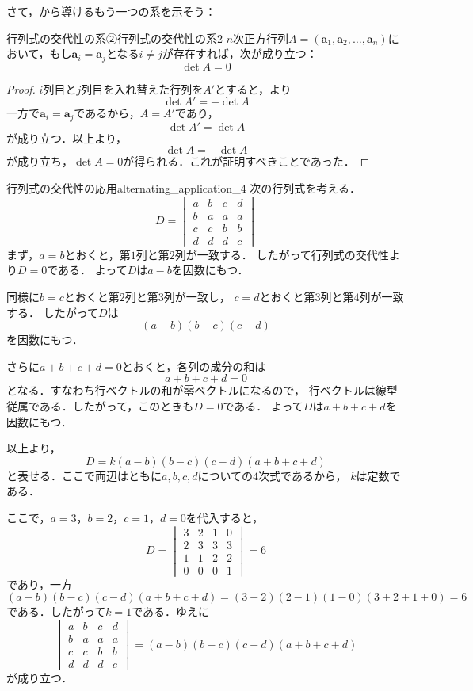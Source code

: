  さて，から導けるもう一つの系を示そう：
\begin{cor}{行列式の交代性の系②}{行列式の交代性の系2}
  $n$次正方行列$A = (\bm{a}_1, \bm{a}_2, \dots, \bm{a}_n)$において，もし$\bm{a}_i = \bm{a}_j$となる$i \ne j$が存在すれば，次が成り立つ：
  \[
  \det A = 0
  \]
\end{cor}

\begin{leftbar}
\begin{proof}
  $i$列目と$j$列目を入れ替えた行列を$A'$とすると，より
  \[
  \det A' = - \det A
  \]
  一方で$\bm{a}_i = \bm{a}_j$であるから，$A = A'$であり，
  \[
  \det A' = \det A
  \]
  が成り立つ．以上より，
  \[
  \det A = - \det A
  \]
  が成り立ち，$\det A = 0$が得られる．これが証明すべきことであった．
\end{proof}
\end{leftbar}

\begin{example}{行列式の交代性の応用}{alternating_application_4}
  次の行列式を考える．
  \[
  D=
  \begin{vmatrix} 
    a & b & c & d \\
    b & a & a & a \\
    c & c & b & b \\
    d & d & d & c
  \end{vmatrix}
  \]
  まず，$a=b$とおくと，第$1$列と第$2$列が一致する．
  したがって行列式の交代性より$D=0$である．
  よって$D$は$a-b$を因数にもつ．

  同様に$b=c$とおくと第$2$列と第$3$列が一致し，
  $c=d$とおくと第$3$列と第$4$列が一致する．
  したがって$D$は
  \[
    (a-b)(b-c)(c-d)
  \]
  を因数にもつ．

  さらに$a+b+c+d=0$とおくと，各列の成分の和は
  \[
    a+b+c+d=0
  \]
  となる．すなわち行ベクトルの和が零ベクトルになるので，
  行ベクトルは線型従属である．したがって，このときも$D=0$である．
  よって$D$は$a+b+c+d$を因数にもつ．

  以上より，
  \[
    D
    = k(a-b)(b-c)(c-d)(a+b+c+d)
  \]
  と表せる．ここで両辺はともに$a,b,c,d$についての$4$次式であるから，
  $k$は定数である．

  ここで，$a=3$，$b=2$，$c=1$，$d=0$を代入すると，
  \[
  D=
  \begin{vmatrix} 
    3 & 2 & 1 & 0 \\
    2 & 3 & 3 & 3 \\
    1 & 1 & 2 & 2 \\
    0 & 0 & 0 & 1
  \end{vmatrix}
  =6
  \]
  であり，一方
  \[
    (a-b)(b-c)(c-d)(a+b+c+d)
    =(3-2)(2-1)(1-0)(3+2+1+0)=6
  \]
  である．したがって$k=1$である．ゆえに
  \[
  \begin{vmatrix} 
    a & b & c & d \\
    b & a & a & a \\
    c & c & b & b \\
    d & d & d & c
  \end{vmatrix}
  =
  (a-b)(b-c)(c-d)(a+b+c+d)
  \]
  が成り立つ．
\end{example}

